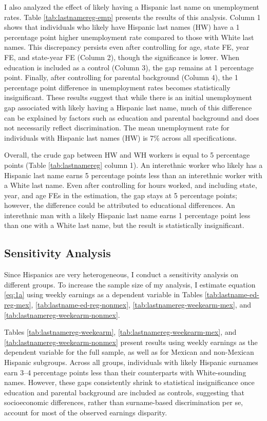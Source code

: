 I also analyzed the effect of likely having a Hispanic last name on unemployment rates. Table \ref{tab:lastnamereg-emp} presents the results of this analysis. Column 1 shows that individuals who likely have Hispanic last names (HW) have a 1 percentage point higher unemployment rate compared to those with White last names. This discrepancy persists even after controlling for age, state FE, year FE, and state-year FE (Column 2), though the significance is lower. When education is included as a control (Column 3), the gap remains at 1 percentage point. Finally, after controlling for parental background (Column 4), the 1 percentage point difference in unemployment rates becomes statistically insignificant. These results suggest that while there is an initial unemployment gap associated with likely having a Hispanic last name, much of this difference can be explained by factors such as education and parental background and does not necessarily reflect discrimination. The mean unemployment rate for individuals with Hispanic last names (HW) is 7\% across all specifications.

Overall, the crude gap between HW and WH workers is equal to 5 percentage points (Table \ref{tab:lastnamereg} column 1). An interethnic worker who likely has a Hispanic last name earns 5 percentage points less than an interethnic worker with a White last name. Even after controlling for hours worked, and including state, year, and age FEs in the estimation, the gap stays at 5 percentage points; however, the difference could be attributed to educational differences. An interethnic man with a likely Hispanic last name earns 1 percentage point less than one with a White last name, but the result is statistically insignificant.


\subsection{Sensitivity Analysis}

Since Hispanics are very heterogeneous, I conduct a sensitivity analysis on different groups. To increase the sample size of my analysis, I estimate equation \ref{eq:1a} using weekly earnings as a dependent variable in Tables \ref{tab:lastname-ed-reg-mex}, \ref{tab:lastname-ed-reg-nonmex}, \ref{tab:lastnamereg-weekearm-mex}, and \ref{tab:lastnamereg-weekearm-nonmex}. 

Tables \ref{tab:lastnamereg-weekearm}, \ref{tab:lastnamereg-weekearm-mex}, and \ref{tab:lastnamereg-weekearm-nonmex} present results using weekly earnings as the dependent variable for the full sample, as well as for Mexican and non-Mexican Hispanic subgroups. Across all groups, individuals with likely Hispanic surnames earn 3–4 percentage points less than their counterparts with White-sounding names. However, these gaps consistently shrink to statistical insignificance once education and parental background are included as controls, suggesting that socioeconomic differences, rather than surname-based discrimination per se, account for most of the observed earnings disparity.

